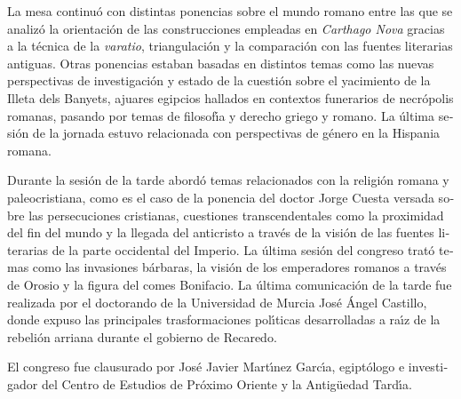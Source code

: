 \begin{otherlanguage}{spanish}
La mesa continu\'{o} con distintas ponencias sobre el mundo romano entre las que se analiz\'{o} la orientaci\'{o}n de las construcciones empleadas en \textit{Carthago Nova} gracias a la t\'{e}cnica de la \textit{varatio}, triangulaci\'{o}n y la comparaci\'{o}n con las fuentes literarias antiguas. Otras ponencias estaban basadas en distintos temas como las nuevas perspectivas de investigaci\'{o}n y estado de la cuesti\'{o}n sobre el yacimiento de la Illeta dels Banyets, ajuares egipcios hallados en contextos funerarios de necr\'{o}polis romanas, pasando por temas de filosof\'{\i}a y derecho griego y romano. La \'{u}ltima sesi\'{o}n de la jornada estuvo relacionada con perspectivas de g\'{e}nero en la Hispania romana. 

Durante la sesi\'{o}n de la tarde abord\'{o} temas relacionados con la religi\'{o}n romana y paleocristiana, como es el caso de la ponencia del doctor Jorge Cuesta versada sobre las persecuciones cristianas, cuestiones transcendentales como la proximidad del fin del mundo y la llegada del anticristo a trav\'{e}s de la visi\'{o}n de las fuentes literarias de la parte occidental del Imperio. 
La \'{u}ltima sesi\'{o}n del congreso trat\'{o} temas como las invasiones b\'{a}rbaras, la visi\'{o}n de los emperadores romanos a trav\'{e}s de Orosio y la figura del comes Bonifacio. La \'{u}ltima comunicaci\'{o}n de la tarde fue realizada por el doctorando de la Universidad de Murcia Jos\'{e} \'{A}ngel Castillo, donde expuso las principales trasformaciones pol\'{\i}ticas desarrolladas a ra\'{\i}z de la rebeli\'{o}n arriana durante el gobierno de Recaredo. 

El congreso fue clausurado por Jos\'{e} Javier Mart\'{\i}nez Garc\'{\i}a, egipt\'{o}logo e investigador del Centro de Estudios de Pr\'{o}ximo Oriente y la Antig\"{u}edad Tard\'{\i}a.  





\IJSRAclosing
\end{otherlanguage}
%